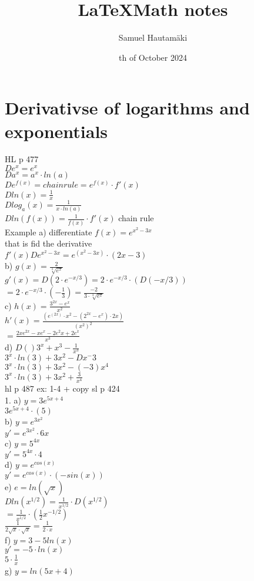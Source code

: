 \documentclass{article}
\title{\LaTeX Math notes}
\author{Samuel Hautamäki}
\date{th of October 2024}
\begin{document}
  \maketitle
   
  \section{Derivativse of logarithms and exponentials}
  HL p 477\\
  $D e^x=e^x$\\
  $D a^x=a^x\cdot ln(a)$\\
  $D e^{f(x)}=chain rule =e^{f(x)}\cdot f'(x)$\\
  $D ln(x)=\frac{1}{x}$\\
  $D log_a(x)=\frac{1}{x\cdot ln(a)}$\\
  $D ln(f(x))=\frac{1}{f(x)}\cdot f'(x)$ chain rule\\
  Example a) differentiate $f(x)=e^{x^2-3x}$\\
  that is fid the derivative\\
  $f'(x) D e^{x^2-3x}=e^(x^2-3x)\cdot(2x-3)$\\
  b) $g(x)=\frac{2}{\sqrt[3]{e^x}}$\\
  $g'(x)=D (2\cdot e^{-x/3})=2\cdot e^{-x/3}\cdot (D(-x/3))$\\
  $=2\cdot e^{-x/3}\cdot(-\frac{1}{3})=\frac{-2}{3\cdot\sqrt[3]{e^x}}$\\
  c) $h(x)=\frac{3^{2x}-e^x}{x^2}$\\
  $h'(x)=\frac{(e^{(2x)}\cdot x^2-(2^{2x}-e^x)\cdot 2x)}{(x^2)^2}$\\
  $=\frac{2xe^{2x}-xe^x-2e^2x+2e^x}{x^3}$\\
  d) $D ()3^x+x^3-\frac{1}{x^3}$\\
  $3^x\cdot ln(3)+3x^2- Dx^-3$\\
  $3^x\cdot ln(3)+3x^2-(-3)x^4$\\
  $3^x\cdot ln(3)+3x^2+\frac{3}{x^4}$\\
  hl p 487 ex: 1-4 + copy sl p 424\\
  1. a) $y=3e^{5x+4}$\\
  $3e^{5x+4}\cdot (5)$\\
  b) $y=e^{3x^2}$\\
  $y'=e^{3x^2}\cdot 6x$\\
  c) $y=5^{4x}$\\
  $y'=5^{4x}\cdot 4$\\
  d) $y=e^{cos(x)}$\\
  $y'=e^{cos(x)}\cdot (-sin(x))$\\
  e) $e=ln(\sqrt{x})$\\
  $D ln(x^{1/2})=\frac{1}{x^{1/2}}\cdot D(x^{1/2})$\\
  $=\frac{1}{x^{1/2}}\cdot (\frac{1}{2}x^{-1/2})$\\
  $\frac{1}{2\sqrt{x}\cdot\sqrt{x}}=\frac{1}{2\cdot x}$\\
  f) $y=3-5 ln(x)$\\
  $y'=-5\cdot ln(x)$\\
  $5\cdot\frac{1}{x}$\\
  g) $y=ln(5x+4)$\\
   
\end{document}
